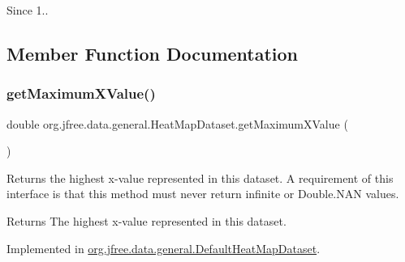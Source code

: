 \begin{DoxySince}{Since}
1.. 
\end{DoxySince}


\subsection{Member Function Documentation}
\mbox{\label{interfaceorg_1_1jfree_1_1data_1_1general_1_1_heat_map_dataset_a252f69b25ce64302493167c5e8576cfe}} 
\subsubsection{\texorpdfstring{get\+Maximum\+X\+Value()}{getMaximumXValue()}}
{\footnotesize\ttfamily double org.\+jfree.\+data.\+general.\+Heat\+Map\+Dataset.\+get\+Maximum\+X\+Value (\begin{DoxyParamCaption}{ }\end{DoxyParamCaption})}

Returns the highest x-\/value represented in this dataset. A requirement of this interface is that this method must never return infinite or Double.\+N\+AN values.

\begin{DoxyReturn}{Returns}
The highest x-\/value represented in this dataset. 
\end{DoxyReturn}


Implemented in \mbox{\hyperlink{classorg_1_1jfree_1_1data_1_1general_1_1_default_heat_map_dataset_aa3c976aabd54b923d2f01cea7b3a0657}{org.\+jfree.\+data.\+general.\+Default\+Heat\+Map\+Dataset}}.

\mbox{\label{interfaceorg_1_1jfree_1_1data_1_1general_1_1_heat_map_dataset_a263e6f91dd132e3c82bb71902f37e73c}} 

